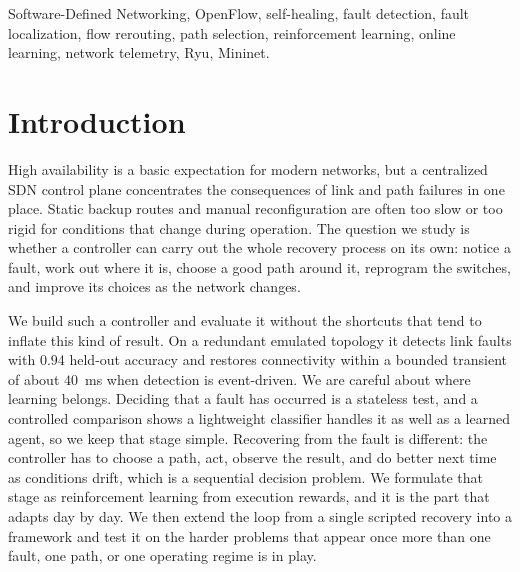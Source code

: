 \documentclass[conference]{IEEEtran}
\begin{document}
\begin{IEEEkeywords}
Software-Defined Networking, OpenFlow, self-healing, fault detection, fault
localization, flow rerouting, path selection, reinforcement learning, online learning, network telemetry,
Ryu, Mininet.
\end{IEEEkeywords}

\section{Introduction}
High availability is a basic expectation for modern networks, but a centralized SDN
control plane concentrates the consequences of link and path failures in one place.
Static backup routes and manual reconfiguration are often too slow or too rigid for
conditions that change during operation. The question we study is whether a
controller can carry out the whole recovery process on its own: notice a fault,
work out where it is, choose a good path around it, reprogram the switches, and
improve its choices as the network changes.

We build such a controller and evaluate it without the shortcuts that tend to
inflate this kind of result. On a redundant emulated topology it detects link faults
with $0.94$ held-out accuracy and restores connectivity within a bounded transient of
about $40$~ms when detection is event-driven. We are careful about where learning
belongs. Deciding that a fault has occurred is a stateless test, and a controlled
comparison shows a lightweight classifier handles it as well as a learned agent, so we
keep that stage simple. Recovering from the fault is different: the controller has to
choose a path, act, observe the result, and do better next time as conditions drift,
which is a sequential decision problem. We formulate that stage as reinforcement
learning from execution rewards, and it is the part that adapts day by day. We then
extend the loop from a single scripted recovery into a framework and test it on the
harder problems that appear once more than one fault, one path, or one operating
regime is in play.
\end{document}
